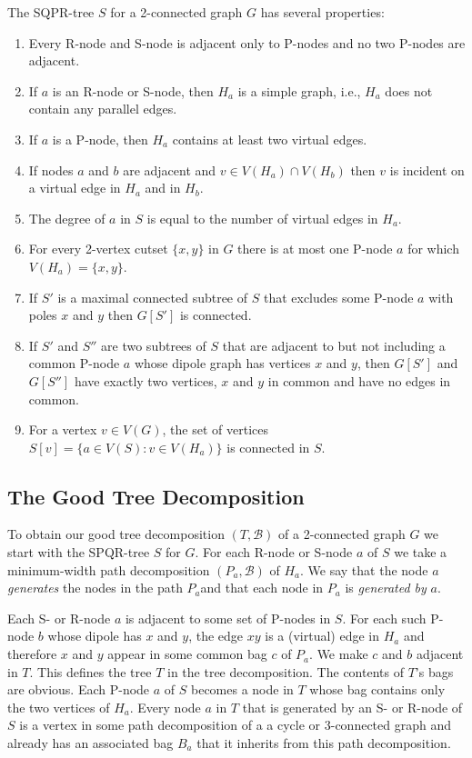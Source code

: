 \documentclass[a4paper,11pt]{article}
\theoremstyle{plain}
\theoremstyle{definition}
\begin{document}
The SQPR-tree $S$ for a 2-connected graph $G$
has several properties:

\begin{enumerate}
   \item Every R-node and S-node is adjacent only to P-nodes and no two
   P-nodes are adjacent.
   \item If $a$ is an R-node or S-node, then $H_a$ is a simple graph, i.e., $H_a$ does not contain any parallel edges.
   \item If $a$ is a P-node, then $H_a$ contains at least two virtual edges.
   \item If nodes $a$ and $b$ are adjacent and $v\in V(H_a)\cap V(H_b)$ then $v$ is incident on a virtual edge in $H_a$ and in $H_b$.
   \item The degree of $a$ in $S$ is equal to the number of virtual edges in $H_a$.
   \item For every 2-vertex cutset $\{x,y\}$ in $G$ there is at most
     one P-node $a$ for which $V(H_a)=\{x,y\}$.
   \item If $S'$ is a maximal connected subtree of $S$ that excludes some P-node    $a$ with poles $x$ and $y$ then $G[S']$ is connected.
   \item If $S'$ and $S''$ are two subtrees of $S$ that are adjacent to
     but not including a common P-node $a$ whose dipole graph has vertices
     $x$ and $y$, then $G[S']$ and $G[S'']$ have exactly two vertices,
     $x$ and $y$ in common and have no edges in common.
   \item For a vertex $v\in V(G)$, the set of vertices $S[v]=\{a\in V(S): v\in V(H_a)\}$ is connected in $S$.
\end{enumerate}


\subsection{The Good Tree Decomposition}

To obtain our good tree decomposition $(T,\mathcal{B})$ of a 2-connected
graph $G$ we start with the SPQR-tree $S$ for $G$.  For each R-node
or S-node $a$ of $S$ we take a minimum-width path decomposition
$(P_a,\mathcal{B})$ of $H_a$.  We say that the node $a$ \emph{generates}
the nodes in the path $P_a$and that each node in $P_a$ is \emph{generated
by} $a$.

Each S- or R-node $a$ is adjacent to some set of P-nodes in $S$. For
each such P-node $b$ whose dipole has $x$ and $y$, the edge $xy$ is a
(virtual) edge in $H_a$ and therefore $x$ and $y$ appear in some common
bag $c$ of $P_a$.  We make $c$ and $b$ adjacent in $T$. This defines
the tree $T$ in the tree decomposition. The contents of $T$'s bags are
obvious. Each P-node $a$ of $S$ becomes a node in $T$ whose bag contains
only the two vertices of $H_a$.  Every node $a$ in $T$ that is generated
by an S- or R-node of $S$ is a vertex in some path decomposition of a
a cycle or 3-connected graph and already has an associated bag $B_a$
that it inherits from this path decomposition.
\end{document}
